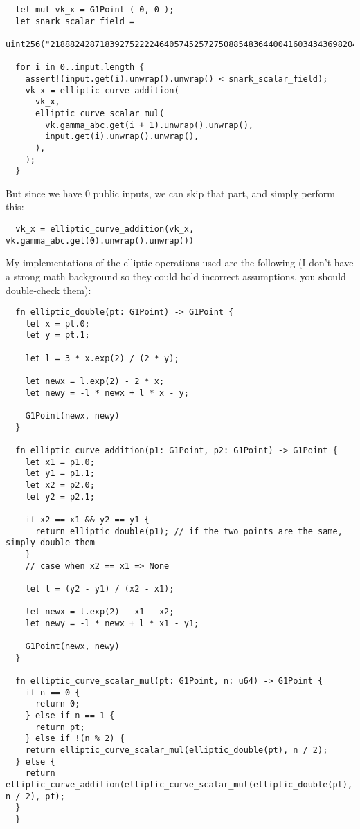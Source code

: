 \documentclass{article}
\begin{document}
\begin{lstlisting}
  let mut vk_x = G1Point ( 0, 0 );
  let snark_scalar_field =
  uint256("21888242871839275222246405745257275088548364400416034343698204186575808495617");
  
  for i in 0..input.length {  
    assert!(input.get(i).unwrap().unwrap() < snark_scalar_field);
    vk_x = elliptic_curve_addition(
      vk_x,
      elliptic_curve_scalar_mul(
        vk.gamma_abc.get(i + 1).unwrap().unwrap(),
        input.get(i).unwrap().unwrap(),
      ),
    );
  }
\end{lstlisting}

But since we have 0 public inputs, we can skip that part, and simply perform this:

\begin{lstlisting}
  vk_x = elliptic_curve_addition(vk_x, vk.gamma_abc.get(0).unwrap().unwrap())
\end{lstlisting}

My implementations of the elliptic operations used are the following (I don't have a strong math background so they could hold incorrect assumptions, you should double-check them):

\begin{lstlisting}
  fn elliptic_double(pt: G1Point) -> G1Point {
    let x = pt.0;
    let y = pt.1;

    let l = 3 * x.exp(2) / (2 * y);

    let newx = l.exp(2) - 2 * x;
    let newy = -l * newx + l * x - y;

    G1Point(newx, newy)
  }

  fn elliptic_curve_addition(p1: G1Point, p2: G1Point) -> G1Point {
    let x1 = p1.0;
    let y1 = p1.1;
    let x2 = p2.0;
    let y2 = p2.1;

    if x2 == x1 && y2 == y1 {
      return elliptic_double(p1); // if the two points are the same, simply double them
    }
    // case when x2 == x1 => None

    let l = (y2 - y1) / (x2 - x1);

    let newx = l.exp(2) - x1 - x2;
    let newy = -l * newx + l * x1 - y1;

    G1Point(newx, newy)
  }

  fn elliptic_curve_scalar_mul(pt: G1Point, n: u64) -> G1Point {
    if n == 0 {
      return 0;
    } else if n == 1 {
      return pt;
    } else if !(n % 2) {
    return elliptic_curve_scalar_mul(elliptic_double(pt), n / 2);
  } else {
    return elliptic_curve_addition(elliptic_curve_scalar_mul(elliptic_double(pt), n / 2), pt);
  }
  }
\end{lstlisting}
\end{document}

